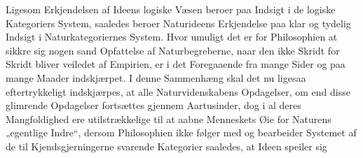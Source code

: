 \documentclass[11pt]{book}
\newcommand{\opage}[1]{\marginnote{\footnotesize\textit{[#1]}}}
\begin{document}
Ligesom Erkjendelsen af Ideens logiske Væsen beroer paa Indsigt i de
logiske Kategoriers System, saaledes beroer Naturideens Erkjendelse paa
klar og tydelig Indsigt i Naturkategoriernes System. Hvor umuligt det er
for Philosophien at sikkre sig nogen sand Opfattelse af Naturbegreberne,
naar den ikke Skridt for Skridt bliver veiledet af Empirien, er i det
Foregaaende fra mange Sider og paa mange Maader indskjærpet. I denne
Sammenhæng skal det nu ligesaa eftertrykkeligt indskjærpes, at alle
Naturvidenskabens Opdagelser, om end disse glimrende Opdagelser
fortsættes gjennem Aartusinder, dog i al deres Mangfoldighed ere
utilstrækkelige til
\opage{290} \setcounter{footnote}{0}%
at aabne Menneskets Øie for Naturens „egentlige Indre“, dersom
Philosophien ikke følger med og bearbeider Systemet af de til
Kjendsgjerningerne svarende Kategorier saaledes, at Ideen speiler sig
\end{document}
